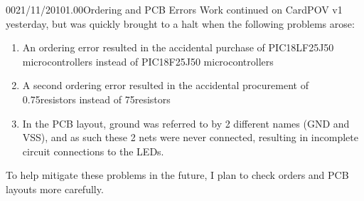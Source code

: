 \documentclass[12pt,letterpaper,onecolumn]{article}
\begin{document}
\begin{nbentry}{002}{1/11/2010}{1.00}{Ordering and PCB Errors}
Work continued on CardPOV v1 yesterday, but was quickly brought to a halt when the following problems
arose:
\begin{enumerate}
\item An ordering error resulted in the accidental purchase of PIC18LF25J50 microcontrollers instead of 
PIC18F25J50 microcontrollers
\item A second ordering error resulted in the accidental procurement of 0.75\ohm resistors instead of 
75\ohm resistors
\item In the PCB layout, ground was referred to by 2 different names (GND and VSS), and as such these 2 nets
were never connected, resulting in incomplete circuit connections to the LEDs.
\end{enumerate}
To help mitigate these problems in the future, I plan to check orders and PCB layouts more carefully.
\end{nbentry}

\end{document}
